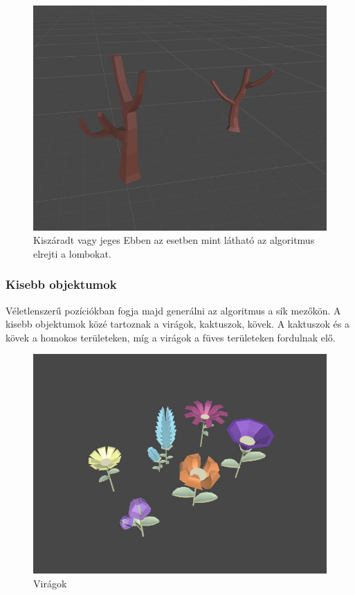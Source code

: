 \begin{figure}[h!]
\centering
\includegraphics[scale=0.35]{kepek/Tree_Winter.JPG}
\caption{Kiszáradt vagy jeges Ebben az esetben mint látható az algoritmus elrejti a lombokat.}
\label{fig:Tree_Winter}
\end{figure}

\newpage
\subsubsection{Kisebb objektumok}

Véletlenszerű pozíciókban fogja majd generálni az algoritmus a sík mezőkön. A kisebb objektumok közé tartoznak a virágok, kaktuszok, kövek. A kaktuszok és a kövek a homokos területeken, míg a virágok a füves területeken fordulnak elő.

\begin{figure}[h!]
\centering
\includegraphics[scale=0.4]{kepek/Flowers.JPG}
\caption{Virágok}
\label{fig:Flowers}
\end{figure}

